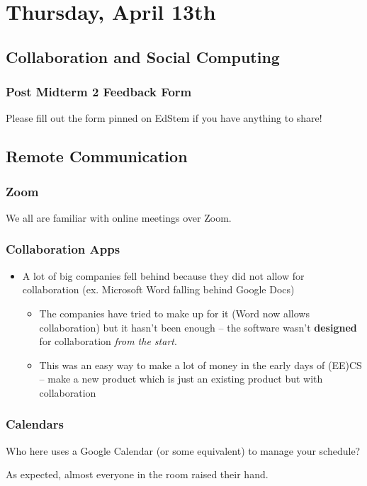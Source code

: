 \section{Thursday, April 13th}
\subsection{Collaboration and Social Computing}
\subsubsection{Post Midterm 2 Feedback Form}
Please fill out the form pinned on EdStem if you have anything to share!

\subsection{Remote Communication}
\subsubsection{Zoom}
We all are familiar with online meetings over Zoom.


\subsubsection{Collaboration Apps}
\begin{itemize}
    \item A lot of big companies fell behind because they did not allow for collaboration (ex. Microsoft Word falling behind Google Docs)
    \begin{itemize}
        \item The companies have tried to make up for it (Word now allows collaboration) but it hasn't been enough -- the software wasn't \textbf{designed} for collaboration \textit{from the start}.
        \item This was an easy way to make a lot of money in the early days of (EE)CS -- make a new product which is just an existing product but with collaboration
    \end{itemize}
\end{itemize}

\subsubsection{Calendars}
\begin{shaded}
Who here uses a Google Calendar (or some equivalent) to manage your schedule?
\end{shaded}
As expected, almost everyone in the room raised their hand.

